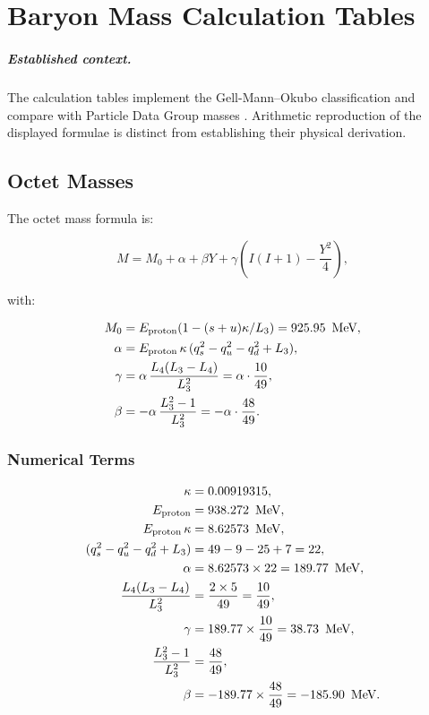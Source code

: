 \chapter{Baryon Mass Calculation Tables}
\label{app:baryon_calculations}


\paragraph{Established context.}
The calculation tables implement the Gell-Mann--Okubo classification
\cite{GellMann1962,okubo1962} and compare with Particle Data Group masses
\cite{PDG2024}.  Arithmetic reproduction of the displayed formulae is distinct
from establishing their physical derivation.

\section{Octet Masses}

The octet mass formula is:

\[
M = M_0 + \alpha + \beta Y + \gamma\left(I(I+1) - \frac{Y^2}{4}\right),
\]

with:

\[
\begin{aligned}
M_0    &= E_{\text{proton}}(1 - (s+u)\kappa/L_3) = 925.95\ \,\text{MeV}, \\
\alpha &= E_{\text{proton}}\,\kappa\,(q_s^2 - q_u^2 - q_d^2 + L_3), \\
\gamma &= \alpha\,\frac{L_4(L_3 - L_4)}{L_3^2}
       = \alpha \cdot \frac{10}{49}, \\
\beta  &= -\alpha\,\frac{L_3^2 - 1}{L_3^2}
       = -\alpha \cdot \frac{48}{49}.
\end{aligned}
\]

\subsection{Numerical Terms}

\[
\begin{aligned}
\kappa &= 0.00919315, \\
E_{\text{proton}} &= 938.272\ \,\text{MeV}, \\
E_{\text{proton}}\,\kappa &= 8.62573\ \,\text{MeV}, \\
(q_s^2 - q_u^2 - q_d^2 + L_3) &= 49 - 9 - 25 + 7 = 22, \\
\alpha &= 8.62573 \times 22 = 189.77\ \,\text{MeV}, \\
\frac{L_4(L_3 - L_4)}{L_3^2} &= \frac{2 \times 5}{49} = \frac{10}{49}, \\
\gamma &= 189.77 \times \frac{10}{49} = 38.73\ \,\text{MeV}, \\
\frac{L_3^2 - 1}{L_3^2} &= \frac{48}{49}, \\
\beta &= -189.77 \times \frac{48}{49} = -185.90\ \,\text{MeV}.
\end{aligned}
\]


